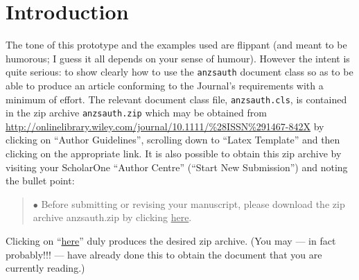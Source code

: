 \documentclass[times, doublespace]{anzsauth}
\begin{document}


\maketitle
\section{Introduction}
\label{sec:intro}
The tone of this prototype and the examples used are flippant
(and meant to be humorous; I guess it all depends on your sense
of humour).  However the intent is quite serious:  to show
clearly how to use the \texttt{anzsauth} document class so as
to be able to produce an article conforming to the Journal's
requirements with a minimum of effort.  The relevant document
class file, \texttt{anzsauth.cls}, is contained in the zip archive
\texttt{anzsauth.zip} which may be obtained from\\
{\small
\url{http://onlinelibrary.wiley.com/journal/10.1111/%28ISSN%291467-842X}
}
\noindent
by clicking on ``Author Guidelines'', scrolling down to ``Latex
Template'' and then clicking on the appropriate link.  It is also
possible to obtain this zip archive by visiting your ScholarOne
``Author Centre'' (``Start New Submission'') and noting the bullet
point:
\begin{quote}
$\bullet$ Before submitting or revising your manuscript, please
download the zip archive anzsauth.zip by clicking \underline{here}.
\end{quote}
Clicking on ``\underline{here}'' duly produces the desired zip
archive.  (You may --- in fact probably!!! --- have already done
this to obtain the document that you are currently reading.)
\end{document}
